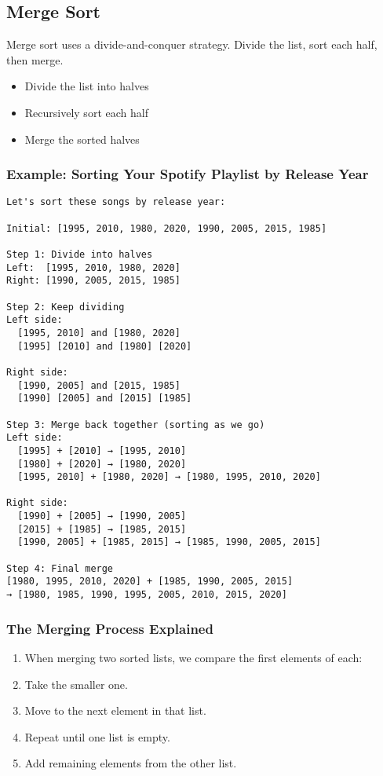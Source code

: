 \documentclass[a4paper,12pt]{article}
\begin{document}
\newpage

\subsection{Merge Sort}

Merge sort uses a divide-and-conquer strategy. Divide the list, sort each half, then merge.

\begin{itemize}
    \item Divide the list into halves
    \item Recursively sort each half
    \item Merge the sorted halves
\end{itemize}

\subsubsection{Example: Sorting Your Spotify Playlist by Release Year}

\begin{verbatim}
Let's sort these songs by release year:

Initial: [1995, 2010, 1980, 2020, 1990, 2005, 2015, 1985]

Step 1: Divide into halves
Left:  [1995, 2010, 1980, 2020]
Right: [1990, 2005, 2015, 1985]

Step 2: Keep dividing
Left side:
  [1995, 2010] and [1980, 2020]
  [1995] [2010] and [1980] [2020]

Right side:
  [1990, 2005] and [2015, 1985]
  [1990] [2005] and [2015] [1985]

Step 3: Merge back together (sorting as we go)
Left side:
  [1995] + [2010] → [1995, 2010]
  [1980] + [2020] → [1980, 2020]
  [1995, 2010] + [1980, 2020] → [1980, 1995, 2010, 2020]

Right side:
  [1990] + [2005] → [1990, 2005]
  [2015] + [1985] → [1985, 2015]
  [1990, 2005] + [1985, 2015] → [1985, 1990, 2005, 2015]

Step 4: Final merge
[1980, 1995, 2010, 2020] + [1985, 1990, 2005, 2015]
→ [1980, 1985, 1990, 1995, 2005, 2010, 2015, 2020]

\end{verbatim}

\subsubsection{The Merging Process Explained}
\begin{enumerate}
    \item When merging two sorted lists, we compare the first elements of each:
    \item Take the smaller one.
    \item Move to the next element in that list.
    \item Repeat until one list is empty.
    \item Add remaining elements from the other list.
\end{enumerate}
\end{document}
